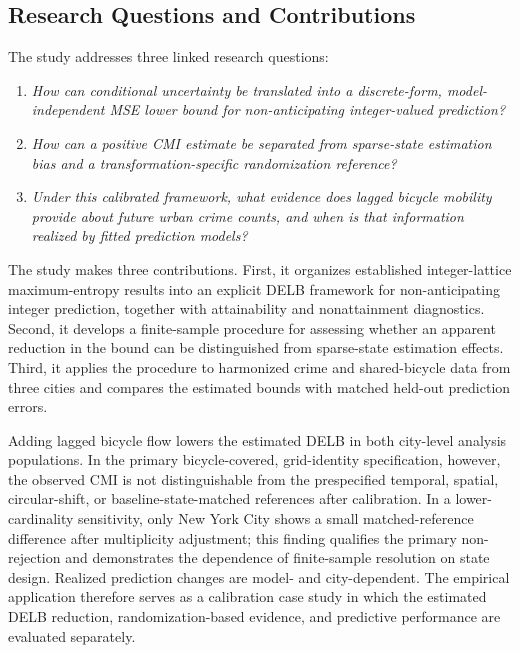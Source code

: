 \documentclass[applsci,article,accept,moreauthors]{Definitions/mdpi}
\def\hl#1{#1}%
\begin{document}
\subsection{Research Questions and Contributions}
\label{subsec:intro_contributions}

The study addresses three linked research questions:

\begin{enumerate}
    \item \textit{\hl{How} %
 can conditional uncertainty be translated into a
    discrete-form, model-independent MSE lower bound for non-anticipating
    integer-valued prediction?}
    \item \textit{\hl{How} can a positive CMI estimate be separated from
    sparse-state estimation bias and a transformation-specific randomization
    reference?}
    \item \textit{\hl{Under} this calibrated framework, what evidence does lagged
    bicycle mobility provide about future urban crime counts, and when is
    that information realized by fitted prediction models?}
\end{enumerate}

{The study makes three contributions. First, it organizes established
integer-lattice maximum-entropy results into an explicit DELB framework for
non-anticipating integer prediction, together with attainability and
nonattainment diagnostics.} Second, it develops a finite-sample
procedure for assessing whether an apparent reduction in the bound can be
distinguished from sparse-state estimation effects. Third, it applies the
procedure to harmonized crime and shared-bicycle data from three cities and
compares the estimated bounds with matched held-out prediction errors.

{Adding lagged bicycle flow lowers the estimated DELB in both city-level
analysis populations. In the primary bicycle-covered, grid-identity
specification, however, the observed CMI is not distinguishable from the
prespecified temporal, spatial,
circular-shift, or baseline-state-matched references after calibration.
In a lower-cardinality sensitivity, only New York City shows a small
matched-reference difference after multiplicity adjustment; this finding
qualifies the primary non-rejection and demonstrates the dependence of
finite-sample resolution on state design.} Realized prediction changes are model- and city-dependent. The empirical
application therefore serves as
a calibration case study in which the estimated DELB reduction,
randomization-based evidence, and predictive performance are evaluated
separately.
\end{document}
